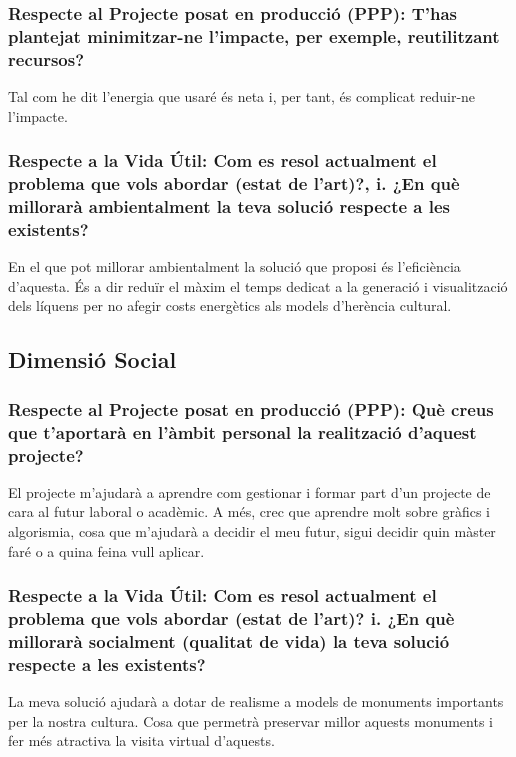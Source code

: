 \documentclass{article}
\begin{document}
\subsubsection{Respecte al Projecte posat en producció (PPP): T’has plantejat minimitzar-ne l'impacte, per exemple, reutilitzant recursos?}

Tal com he dit l'energia que usaré és neta i, per tant, és complicat reduir-ne l'impacte.

\subsubsection{Respecte a la Vida Útil: Com es resol actualment el problema que vols abordar (estat de l’art)?, i. ¿En què millorarà ambientalment la teva solució respecte a les existents?}

En el que pot millorar ambientalment la solució que proposi és l'eficiència d'aquesta. És a dir reduïr el màxim el temps dedicat a la generació i visualització dels líquens per no afegir costs energètics als models d'herència cultural.

\subsection{Dimensió Social}

\subsubsection{Respecte al Projecte posat en producció (PPP): Què creus que t’aportarà en l'àmbit personal la realització d’aquest projecte?}

El projecte m'ajudarà a aprendre com gestionar i formar part d'un projecte de cara al futur laboral o acadèmic. A més, crec que aprendre molt sobre gràfics i algorismia, cosa que m'ajudarà a decidir el meu futur, sigui decidir quin màster faré o a quina feina vull aplicar.

\subsubsection{Respecte a la Vida Útil: Com es resol actualment el problema que vols abordar (estat de l’art)? i. ¿En què millorarà socialment (qualitat de vida) la teva solució respecte a les existents?}

La meva solució ajudarà a dotar de realisme a models de monuments importants per la nostra cultura. Cosa que permetrà preservar millor aquests monuments i fer més atractiva la visita virtual d'aquests.
\end{document}
